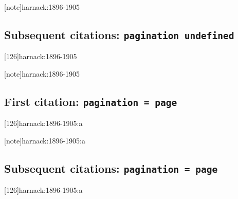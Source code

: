 \documentclass[a4paper]{article}
\begin{document}
\citereset
{}

\citereset
\AtNextCite{\renewcommand*{\volcitedelim}{\addcomma\space}}
[note]{harnack:1896-1905}

\citereset
\cite[note]{harnack:1896-1905}

\subsection{Subsequent citations: \texttt{pagination undefined}}

\cite{harnack:1896-1905}

\cite[2:126]{harnack:1896-1905}

\cite[126]{harnack:1896-1905}

[126]{harnack:1896-1905}


\AtNextCite{\renewcommand*{\volcitedelim}{\addcomma\space}}
[note]{harnack:1896-1905}

\cite[note]{harnack:1896-1905}

\subsection{First citation: \texttt{pagination = page}}

\cite{harnack:1896-1905:a}

\citereset
\cite[2:126]{harnack:1896-1905:a}

\citereset
\cite[126]{harnack:1896-1905:a}

\citereset
{}[126]{harnack:1896-1905:a}

\citereset
{}

\citereset
{}[note]{harnack:1896-1905:a}

\citereset
\cite[note]{harnack:1896-1905:a}

\subsection{Subsequent citations: \texttt{pagination = page}}

\cite{harnack:1896-1905:a}

\cite[2:126]{harnack:1896-1905:a}

\cite[126]{harnack:1896-1905:a}

[126]{harnack:1896-1905:a}

\end{document}

